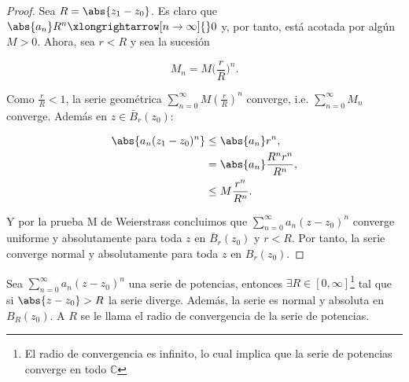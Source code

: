 \documentclass[../main.tex]{subfiles}
\begin{document}
\begin{proof}
    Sea \(R = \abs{z_{1} - z_{0}}\). Es claro que \(\abs{a_{n}}R^{n} \xlongrightarrow[n
    \to \infty]{} 0\) y, por tanto, está acotada por algún \(M > 0\). Ahora, sea \(r <
    R\) y sea la sucesión

    \begin{equation*}
        M_{n} = M\bigl(\dfrac{r}{R}\bigr)^{n}.
    \end{equation*}

    Como \(\tfrac{r}{R} < 1\), la serie geométrica \(\sum_{n =
    0}^{\infty}M(\tfrac{r}{R})^{n}\) converge, i.e. \(\sum_{n =
    0}^{\infty}M_{n}\) converge.
    Además en \(z\in \bar{B}_{r}(z_{0})\):

    \begin{align*}
        \abs{a_{n}(z_{1} - z_{0})^{n}} &\leq \abs{a_{n}}r^{n},\\
        &= \abs{a_{n}}\dfrac{R^{n}r^{n}}{R^{n}},\\
        &\leq M \dfrac{r^{n}}{R^{n}}.
    \end{align*}

    Y por la prueba M de Weierstrass concluimos que \(\sum_{n = 0}^{\infty}a_{n}(z -
    z_{0})^{n}\) converge uniforme y absolutamente para toda \(z\) en
    \(\bar{B}_{r}(z_{0})\) y \(r < R\). Por tanto, la serie converge normal y
    absolutamente
    para toda \(z\) en \(B_{r}(z_{0})\).
\end{proof}

\begin{proposition}\label{prop:radius-of-convergence}
    Sea \(\sum_{n = 0}^{\infty}a_{n}(z - z_{0})^{n}\) una serie de potencias, entonces
    \(\exists R\in [0, \infty]\)\footnote{El radio de convergencia es infinito, lo cual
    implica que la serie de potencias converge en todo \(\mathbb{C}\)} tal que si \(
    \abs{z - z_{0}} > R\) la serie diverge. Además, la serie es normal y absoluta en
    \(B_{R}(z_{0})\). A \(R\) se le llama el radio de convergencia de la
    serie de potencias.
\end{proposition}
\end{document}
